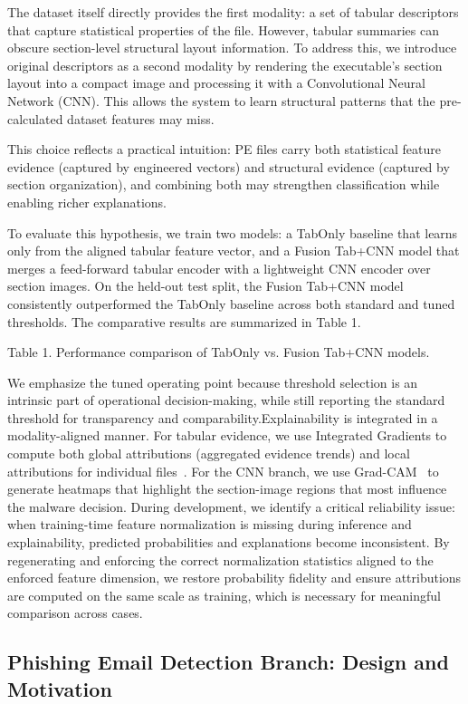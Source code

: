 \documentclass[conference]{IEEEtran}
\begin{document}
The dataset itself directly provides the first modality: a set of tabular descriptors that capture statistical properties of the file. However, tabular summaries can obscure section-level structural layout information. To address this, we introduce original descriptors as a second modality by rendering the executable’s section layout into a compact image and processing it with a Convolutional Neural Network (CNN). This allows the system to learn structural patterns that the pre-calculated dataset features may miss.

This choice reflects a practical intuition: PE files carry both statistical feature evidence (captured by engineered vectors) and structural evidence (captured by section organization), and combining both may strengthen classification while enabling richer explanations.

To evaluate this hypothesis, we train two models: a TabOnly baseline that learns only from the aligned tabular feature vector, and a Fusion Tab+CNN model that merges a feed-forward tabular encoder with a lightweight CNN encoder over section images. On the held-out test split, the Fusion Tab+CNN model consistently outperformed the TabOnly baseline across both standard and tuned thresholds. The comparative results are summarized in Table 1.

Table 1. Performance comparison of TabOnly vs. Fusion Tab+CNN models.

We emphasize the tuned operating point because threshold selection is an intrinsic part of operational decision-making, while still reporting the standard threshold for transparency and comparability.Explainability is integrated in a modality-aligned manner. For tabular evidence, we use Integrated Gradients to compute both global attributions (aggregated evidence trends) and local attributions for individual files~\cite{MAQ2017}. For the CNN branch, we use Grad-CAM~\cite{SCDVPB2017} to generate heatmaps that highlight the section-image regions that most influence the malware decision. During development, we identify a critical reliability issue: when training-time feature normalization is missing during inference and explainability, predicted probabilities and explanations become inconsistent. By regenerating and enforcing the correct normalization statistics aligned to the enforced feature dimension, we restore probability fidelity and ensure attributions are computed on the same scale as training, which is necessary for meaningful comparison across cases.

\subsection{Phishing Email Detection Branch: Design and Motivation}
\end{document}
